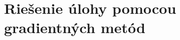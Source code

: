 \documentclass[report.tex]{subfiles}
\begin{document}
\section{Riešenie úlohy pomocou gradientných metód}\label{sec:gradient}
\end{document}
